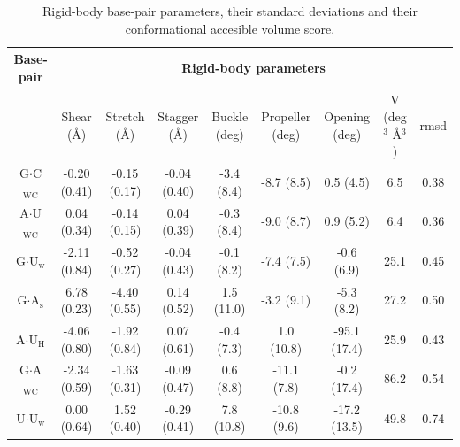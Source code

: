 \begin{table}
\begin{center}
\begin{tabular}{|c|c|c|c|c|c|c|c|c|}
\hline
Base-pair & \multicolumn{8}{c|}{Rigid-body parameters} \\
\hline
 & Shear (\AA) & Stretch (\AA) & Stagger (\AA) & Buckle (deg) &
Propeller (deg) & Opening (deg) & V (deg$^{\text{3}}$
\AA$^{\text{3}}$) & rmsd \\
\hline
G$\cdot$C$_{\text{WC}}$ & -0.20 (0.41) & -0.15 (0.17) & -0.04 (0.40) & -3.4 (8.4)  &  -8.7  (8.5) &  0.5  (4.5)  & 6.5   & 0.38\\
A$\cdot$U$_{\text{WC}}$ &  0.04 (0.34) & -0.14 (0.15) &  0.04 (0.39) & -0.3 (8.4)  &  -9.0  (8.7) &  0.9  (5.2)  & 6.4   & 0.36\\
G$\cdot$U$_{\text{w}}$  & -2.11 (0.84) & -0.52 (0.27) & -0.04 (0.43) & -0.1 (8.2)  &  -7.4  (7.5) & -0.6  (6.9)  & 25.1  & 0.45\\
G$\cdot$A$_{\text{s}}$  &  6.78 (0.23) & -4.40 (0.55) &  0.14 (0.52) &  1.5 (11.0) &  -3.2  (9.1) & -5.3  (8.2)  & 27.2  & 0.50\\
A$\cdot$U$_{\text{H}}$  & -4.06 (0.80) & -1.92 (0.84) &  0.07 (0.61) & -0.4 (7.3)  &   1.0 (10.8) & -95.1 (17.4) & 25.9  & 0.43\\
G$\cdot$A$_{\text{WC}}$ & -2.34 (0.59) & -1.63 (0.31) & -0.09 (0.47) &  0.6 (8.8)  & -11.1  (7.8) & -0.2  (17.4) & 86.2  & 0.54\\
U$\cdot$U$_{\text{w}}$  &  0.00 (0.64) &  1.52 (0.40) & -0.29 (0.41) &  7.8 (10.8) & -10.8  (9.6) & -17.2 (13.5) & 49.8  & 0.74\\
\hline
\end{tabular}
\caption{Rigid-body base-pair parameters, their standard deviations
  and their conformational accesible volume score.}
\label{tab:bppar}
\end{center}
\end{table}




